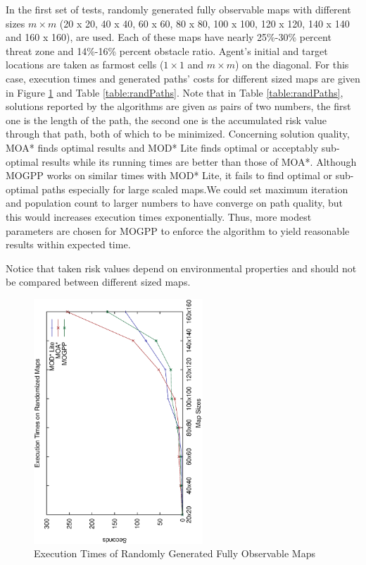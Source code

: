 \documentclass[10pt,journal]{IEEEtran}
\begin{document}
In the first set of tests, randomly generated fully observable maps with different sizes $m \times m$ (20 x 20, 40 x 40, 60 x 60, 80 x 80, 100 x 100, 120 x 120, 140 x 140 and 160 x 160), are used. Each of these maps have nearly 25\%-30\% percent threat zone and 14\%-16\% percent obstacle ratio. Agent's initial and target locations are taken as farmost cells ($1 \times 1$ and $m \times m$) on the diagonal. For this case, execution times and generated paths' costs for different sized maps are given in Figure \ref{fig:rand_fully} and Table \ref{table:randPaths}. Note that in Table \ref{table:randPaths}, solutions reported by the algorithms are given as pairs of two numbers, the first one is the length of the path, the second one is the accumulated risk value through that path, both of which to be minimized. Concerning solution quality, MOA* finds optimal results and MOD* Lite finds optimal or acceptably sub-optimal results while its running times are better than those of MOA*. Although MOGPP works on similar times with MOD* Lite, it fails to find optimal or sub-optimal paths  especially for large scaled maps.We could set maximum iteration and population count to larger numbers to have converge on path quality, but this would increases execution times exponentially. Thus, more modest parameters are chosen for MOGPP to enforce the algorithm to yield reasonable results within expected time. 
 
Notice that taken risk values depend on environmental properties and should not be compared between different sized maps.

\begin{figure}
\centering
\includegraphics[width=2.5in, angle=270]{experimental/randomized_normal}
\caption{Execution Times of Randomly Generated Fully Observable Maps}
\label{fig:rand_fully}
\end{figure}
\end{document}
